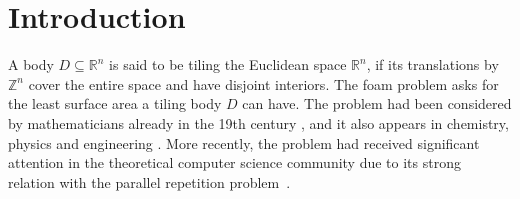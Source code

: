 \section{Introduction}

A body $D\subseteq\mathbb{R}^n$ is said to be tiling the Euclidean space $\mathbb{R}^n$, if its translations by $\mathbb{Z}^n$
cover the entire space and have disjoint interiors. The foam problem asks for the least surface area a tiling body
$D$ can have. The problem had been considered by mathematicians already in the 19th century \cite{Thomson87},
and it also appears in chemistry, physics and engineering \cite{chemistry}. More recently, the problem had received
significant attention in the theoretical computer science community due to its strong relation with the parallel repetition problem~\cite{FKO,KROW,AK}.


